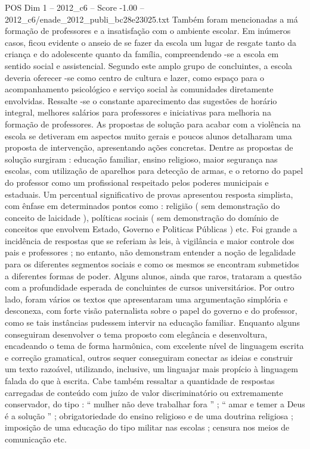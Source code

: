 \begin{textsample}{POS Dim 1 – 2012\_c6 – Score -1.00 – 2012\_c6/enade\_2012\_publi\_bc28e23025.txt}
Também foram mencionadas a má formação de professores e a insatisfação com o ambiente escolar.
Em inúmeros casos, ficou evidente o anseio de se fazer da escola um lugar de resgate tanto da criança e do adolescente quanto da família, compreendendo -se a escola em sentido social e assistencial.
Segundo este amplo grupo de concluintes, a escola deveria oferecer -se como centro de cultura e lazer, como espaço para o acompanhamento psicológico e serviço social às comunidades diretamente envolvidas.
Ressalte -se o constante aparecimento das sugestões de horário integral, melhores salários para professores e iniciativas para melhoria na formação de professores.
As propostas de solução para acabar com a violência na escola se detiveram em aspectos muito gerais e poucos alunos detalharam uma proposta de intervenção, apresentando ações concretas.
Dentre as propostas de solução surgiram : educação familiar, ensino religioso, maior segurança nas escolas, com utilização de aparelhos para detecção de armas, e o retorno do papel do professor como um profissional respeitado pelos poderes municipais e estaduais.
Um percentual significativo de provas apresentou resposta simplista, com ênfase em determinados pontos como : religião ( sem demonstração do conceito de laicidade ), políticas sociais ( sem demonstração do domínio de conceitos que envolvem Estado, Governo e Politicas Públicas ) etc.
Foi grande a incidência de respostas que se referiam às leis, à vigilância e maior controle dos pais e professores ; no entanto, não demonstram entender a noção de legalidade para os diferentes segmentos sociais e como os mesmos se encontram submetidos a diferentes formas de poder.
Alguns alunos, ainda que raros, trataram a questão com a profundidade esperada de concluintes de cursos universitários.
Por outro lado, foram vários os textos que apresentaram uma argumentação simplória e desconexa, com forte visão paternalista sobre o papel do governo e do professor, como se tais instâncias pudessem intervir na educação familiar.
Enquanto alguns conseguiram desenvolver o tema proposto com elegância e desenvoltura, encadeando o tema de forma harmônica, com excelente nível de linguagem escrita e correção gramatical, outros sequer conseguiram conectar as ideias e construir um texto razoável, utilizando, inclusive, um linguajar mais propício à linguagem falada do que à escrita.
Cabe também ressaltar a quantidade de respostas carregadas de conteúdo com juízo de valor discriminatório ou extremamente conservador, do tipo : “ mulher não deve trabalhar fora ” ; “ amar e temer a Deus é a solução ” ; obrigatoriedade do ensino religioso e de uma doutrina religiosa ; imposição de uma educação do tipo militar nas escolas ; censura nos meios de comunicação etc.

\end{textsample}
